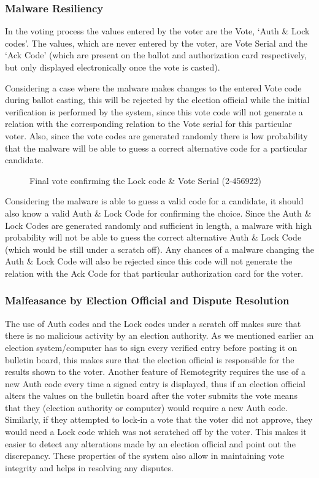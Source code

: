 \subsubsection{Malware Resiliency}

In the voting process the values entered by the voter are the Vote,
`Auth \& Lock codes'. The values, which are never entered by the
voter, are Vote Serial and the `Ack Code' (which are present on the
ballot and authorization card respectively, but only displayed
electronically once the vote is casted).

Considering a case where the malware makes changes to the entered Vote
code during ballot casting, this will be rejected by the election
official while the initial verification is performed by the system,
since this vote code will not generate a relation with the
corresponding relation to the Vote serial for this particular
voter. Also, since the vote codes are generated randomly there is low
probability that the malware will be able to guess a correct
alternative code for a particular candidate.

\begin{figure}
  \centering {}
  \caption{Final vote confirming the Lock code \& Vote Serial
    (2-456922)}
  \label{fig:remotegrity-lock}
\end{figure}

Considering the malware is able to guess a valid code for a candidate,
it should also know a valid Auth \& Lock Code for confirming the
choice. Since the Auth \& Lock Codes are generated randomly and
sufficient in length, a malware with high probability will not be able
to guess the correct alternative Auth \& Lock Code (which would be
still under a scratch off). Any chances of a malware changing the Auth
\& Lock Code will also be rejected since this code will not generate
the relation with the Ack Code for that particular authorization card
for the voter.

\subsubsection{Malfeasance by Election Official and Dispute Resolution}

The use of Auth codes and the Lock codes under a scratch off makes
sure that there is no malicious activity by an election authority. As
we mentioned earlier an election system/computer has to sign every
verified entry before posting it on bulletin board, this makes sure
that the election official is responsible for the results shown to the
voter. Another feature of Remotegrity requires the use of a new Auth
code every time a signed entry is displayed, thus if an election
official alters the values on the bulletin board after the voter
submits the vote means that they (election authority or computer)
would require a new Auth code. Similarly, if they attempted to lock-in
a vote that the voter did not approve, they would need a Lock code
which was not scratched off by the voter. This makes it easier to
detect any alterations made by an election official and point out the
discrepancy. These properties of the system also allow in maintaining
vote integrity and helps in resolving any disputes.

